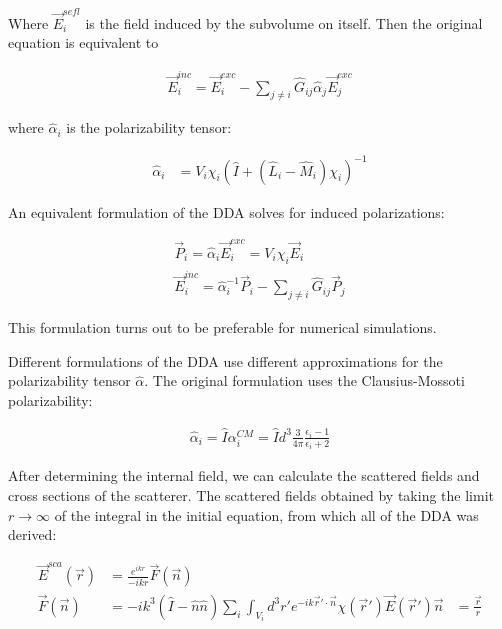     Where $\vec{E}_i^{sefl}$ is the field induced by the subvolume on itself. Then the original equation is equivalent to

    \begin{align}
        \vec{E}_i^{inc} = \vec{E}_i^{exc} - \sum_{j\neq i}\hat{G}_{ij}\hat{\alpha}_j\vec{E}_j^{exc}
    \end{align}

    where $\hat{\alpha}_i$ is the polarizability tensor:

    \begin{align}
        \hat{\alpha}_i &= V_i\chi_i\left(\hat{I} + \left(\hat{L}_i - \hat{M}_i\right)\chi_i\right)^{-1}
    \end{align}

    An equivalent formulation of the DDA solves for induced polarizations:

    \begin{align}
        \vec{P}_i = \hat{\alpha}_i\vec{E}_i^{exc} = V_i\chi_i\vec{E}_i \\
        \vec{E}_i^{inc} = \hat{\alpha}_i^{-1}\vec{P}_i - \sum_{j \neq i} \hat{G}_{ij}\vec{P}_j
    \end{align}

    This formulation turns out to be preferable for numerical simulations.

    Different formulations of the DDA use different approximations for the polarizability tensor $\hat{\alpha}$. The original
    formulation uses the Clausius-Mossoti polarizability:

    \begin{align}
        \hat{\alpha}_i = \hat{I}\alpha_i^{CM} = \hat{I}d^3\frac{3}{4\pi}\frac{\epsilon_i -1}{\epsilon_i + 2}
    \end{align}

    After determining the internal field, we can calculate the scattered fields and cross sections of the scatterer. The
    scattered fields obtained by taking the limit $r \rightarrow \infty$ of the integral in the initial equation, from which
    all of the DDA was derived:

    \begin{align}
        \vec{E}^{sca}(\vec{r}) &= \frac{e^{ikr}}{-ikr}\vec{F}(\vec{n}) \\
        \vec{F}(\vec{n}) &= -ik^3\left(\hat{I}
                            - \hat{n}\hat{n}\right)\sum_i \int_{V_i}d^3r'e^{-ik\vec{r}'\cdot\vec{n}}\chi(\vec{r}')\vec{E}(\vec{r}')
        \vec{n} &= \frac{\vec{r}}{r}
    \end{align}

